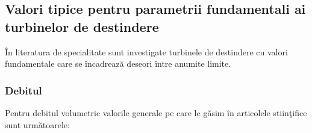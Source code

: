 \subsection{Valori tipice pentru parametrii fundamentali ai turbinelor de destindere}

\^{I}n literatura de specialitate sunt investigate turbinele de destindere cu valori fundamentale care se \^{i}ncadreaz\u{a} deseori \^{i}ntre anumite limite.


\subsubsection{Debitul}
Pentru debitul volumetric valorile generale pe care le g\u{a}sim \^{i}n articolele stiin\c{t}ifice sunt urm\u{a}toarele:

